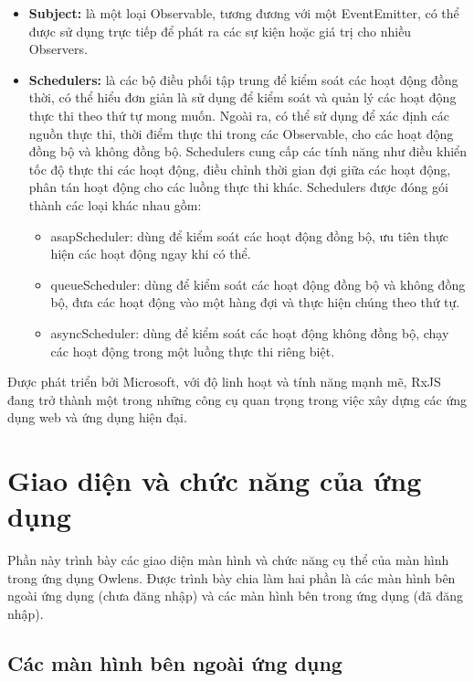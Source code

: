 \begin{itemize}
      \item \textbf{Subject:} là một loại Observable, tương đương với một EventEmitter, có thể được sử dụng trực tiếp để phát ra các sự kiện hoặc giá trị cho nhiều Observers.
      \item \textbf{Schedulers:} là các bộ điều phối tập trung để kiểm soát các hoạt động đồng thời, có thể hiểu đơn giản là sử dụng để kiểm soát và quản lý các hoạt động thực thi theo thứ tự mong muốn.
            Ngoài ra, có thể sử dụng để xác định các nguồn thực thi, thời điểm thực thi trong các Observable, cho các hoạt động đồng bộ và không đồng bộ.
            Schedulers cung cấp các tính năng như điều khiển tốc độ thực thi các hoạt động, điều chỉnh thời gian đợi giữa các hoạt động, phân tán hoạt động cho các luồng thực thi khác.
            Schedulers được đóng gói thành các loại khác nhau gồm:
            \begin{itemize}
                  \item asapScheduler: dùng để kiểm soát các hoạt động đồng bộ, ưu tiên thực hiện các hoạt động ngay khi có thể.
                  \item queueScheduler: dùng để kiểm soát các hoạt động đồng bộ và không đồng bộ, đưa các hoạt động vào một hàng đợi và thực hiện chúng theo thứ tự.
                  \item asyncScheduler: dùng để kiểm soát các hoạt động không đồng bộ, chạy các hoạt động trong một luồng thực thi riêng biệt.
            \end{itemize}
\end{itemize}

Được phát triển bởi Microsoft, với độ linh hoạt và tính năng mạnh mẽ, RxJS đang trở thành một trong những công cụ quan trọng trong việc xây dựng các ứng dụng web và ứng dụng hiện đại.

\newpage
\section{Giao diện và chức năng của ứng dụng}

\tab Phần này trình bày các giao diện màn hình và chức năng cụ thể của màn hình trong ứng dụng Owlens.
Được trình bày chia làm hai phần là các màn hình bên ngoài ứng dụng (chưa đăng nhập) và các màn hình bên trong ứng dụng (đã đăng nhập).

\subsection{Các màn hình bên ngoài ứng dụng}

